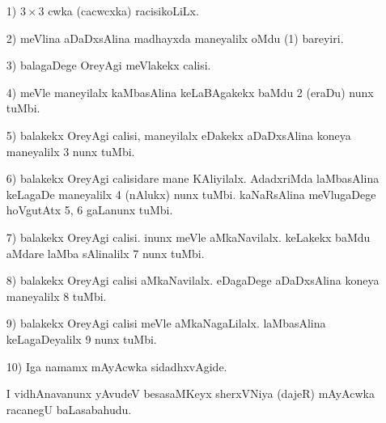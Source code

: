 \begin{enumerate}
\item[{\rm 1)}]  $3\times 3$ cwka (cacwcxka) racisikoLiLx.

\item[{\rm 2)}] meVlina aDaDxsAlina madhayxda maneyalilx oMdu {\rm (1)} bareyiri.

\item[{\rm 3)}] balagaDege OreyAgi meVlakekx calisi.

\item[{\rm 4)}] meVle maneyilalx kaMbasAlina keLaBAgakekx baMdu {\rm 2} (eraDu) nunx tuMbi.

\item[{\rm 5)}] balakekx OreyAgi calisi, maneyilalx eDakekx aDaDxsAlina koneya maneyalilx {\rm 3} nunx tuMbi.

\item[{\rm 6)}] balakekx OreyAgi calisidare mane KAliyilalx. AdadxriMda laMbasAlina keLagaDe maneyalilx {\rm 4} (nAlukx) nunx tuMbi. kaNaRsAlina meVlugaDege hoVgutAtx {\rm 5, 6} gaLanunx tuMbi.

\item[{\rm 7)}] balakekx OreyAgi calisi. inunx meVle aMkaNavilalx. keLakekx baMdu aMdare laMba sAlinalilx {\rm 7} nunx tuMbi.

\item[{\rm 8)}] balakekx OreyAgi calisi aMkaNavilalx. eDagaDege aDaDxsAlina koneya maneyalilx {\rm 8} tuMbi.

\item[{\rm 9)}] balakekx OreyAgi calisi meVle aMkaNagaLilalx. laMbasAlina keLagaDeyalilx {\rm 9} nunx tuMbi.

\item[{\rm 10)}] Iga namamx mAyAcwka sidadhxvAgide.

 I vidhAnavanunx yAvudeV besasaMKeyx sherxVNiya (dajeR) mAyAcwka racanegU baLasabahudu.
\end{enumerate}



